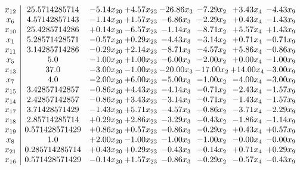 \documentclass[8pt]{article}
\begin{document}
\[\begin{array}{c| c c@{\hskip 2pt} c@{\hskip 2pt} c@{\hskip 2pt} c@{\hskip 2pt} c@{\hskip 2pt} c@{\hskip 2pt} }
 x_{12}   &  25.5714285714 & -5.14 x_{20} & +  4.57 x_{23} & -26.86 x_{3} & -7.29 x_{2} & +  3.43 x_{4} & -4.43 x_{9}\\
 x_{6}   &  4.57142857143 & -1.14 x_{20} & +  1.57 x_{23} & -6.86 x_{3} & -2.29 x_{2} & +  0.43 x_{4} & -1.43 x_{9}\\
 x_{10}   &  25.4285714286 & +  0.14 x_{20} & -6.57 x_{23} & -1.14 x_{3} & -8.71 x_{2} & +  5.57 x_{4} & +  1.43 x_{9}\\
 x_{1}   &  5.28571428571 & -0.57 x_{20} & +  0.29 x_{23} & -4.43 x_{3} & -3.14 x_{2} & +  0.71 x_{4} & -0.71 x_{9}\\
 x_{11}   &  3.14285714286 & -0.29 x_{20} & +  2.14 x_{23} & -8.71 x_{3} & -4.57 x_{2} & +  5.86 x_{4} & -0.86 x_{9}\\
 x_{5}   &  5.0 & -1.00 x_{20} & +  1.00 x_{23} & -6.00 x_{3} & -2.00 x_{2} & +  0.00 x_{4} & -1.00 x_{9}\\
 x_{13}   &  37.0 & -3.00 x_{20} & -1.00 x_{23} & -20.00 x_{3} & -17.00 x_{2} & + 14.00 x_{4} & -3.00 x_{9}\\
 x_{7}   &  4.0 & -2.00 x_{20} & +  6.00 x_{23} & -5.00 x_{3} & -1.00 x_{2} & -4.00 x_{4} & -3.00 x_{9}\\
 x_{15}   &  3.42857142857 & -0.86 x_{20} & +  4.43 x_{23} & -4.14 x_{3} & -0.71 x_{2} & -2.43 x_{4} & -1.57 x_{9}\\
 x_{14}   &  2.42857142857 & -0.86 x_{20} & +  3.43 x_{23} & -3.14 x_{3} & -0.71 x_{2} & -1.43 x_{4} & -1.57 x_{9}\\
 x_{17}   &  3.71428571429 & -1.43 x_{20} & +  5.71 x_{23} & -4.57 x_{3} & -0.86 x_{2} & -3.71 x_{4} & -2.29 x_{9}\\
 x_{18}   &  2.85714285714 & +  0.29 x_{20} & +  2.86 x_{23} & -3.29 x_{3} & -0.43 x_{2} & -1.86 x_{4} & -1.14 x_{9}\\
 x_{19}   &  0.571428571429 & +  0.86 x_{20} & +  0.57 x_{23} & -0.86 x_{3} & -0.29 x_{2} & +  0.43 x_{4} & +  0.57 x_{9}\\
 x_{8}   &  1.0 & +  2.00 x_{20} & -1.00 x_{23} & -1.00 x_{3} & -1.00 x_{2} & -0.00 x_{4} & -0.00 x_{9}\\
 x_{21}   &  0.285714285714 & +  0.43 x_{20} & +  0.29 x_{23} & -0.43 x_{3} & -0.14 x_{2} & +  0.71 x_{4} & +  0.29 x_{9}\\
 x_{16}   &  0.571428571429 & -0.14 x_{20} & +  1.57 x_{23} & -0.86 x_{3} & -0.29 x_{2} & -0.57 x_{4} & -0.43 x_{9}\\

\end{array}\]
\end{document}
